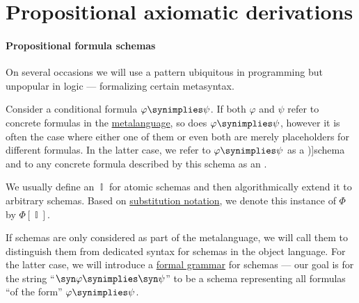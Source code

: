 \section{Propositional axiomatic derivations}\label{sec:propositional_axiomatic_derivations}

\paragraph{Propositional formula schemas}

\begin{concept}\label{con:schemas_and_instances}
  On several occasions we will use a pattern ubiquitous in programming but unpopular in logic --- formalizing certain metasyntax.

  Consider a conditional formula \( \varphi \synimplies \psi \). If both \( \varphi \) and \( \psi \) refer to concrete formulas in the \hyperref[con:metalanguage]{metalanguage}, so does \( \varphi \synimplies \psi \), however it is often the case where either one of them or even both are merely placeholders for different formulas. In the latter case, we refer to \( \varphi \synimplies \psi \) as a \term[ru=схема (формул) (\cite[20]{Эдельман1975Логика})]{schema} and to any concrete formula described by this schema as an .

  We usually define an  \( \BbbI \) for atomic schemas and then algorithmically extend it to arbitrary schemas. Based on \hyperref[rem:substitution_notation]{substitution notation}, we denote this instance of \( \Phi \) by \( \Phi[\BbbI] \).

  If schemas are only considered as part of the metalanguage, we will call them  to distinguish them from dedicated syntax for schemas in the object language. For the latter case, we will introduce a \hyperref[def:formal_grammar]{formal grammar} for schemas --- our goal is for the string \enquote{\( \syn\varphi \synimplies \syn\psi \)} to be a schema representing all formulas \enquote{of the form} \( \varphi \synimplies \psi \).
\end{concept}
